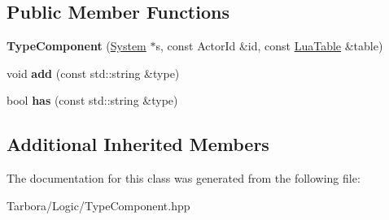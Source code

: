\subsection*{Public Member Functions}
\begin{DoxyCompactItemize}
\item 
\mbox{\label{classTarbora_1_1TypeComponent_ab59ac0e5fbeb699b383b3ce051663220}} 
{\bfseries Type\+Component} (\hyperlink{classTarbora_1_1System}{System} $\ast$s, const Actor\+Id \&id, const \hyperlink{classTarbora_1_1LuaTable}{Lua\+Table} \&table)
\item 
\mbox{\label{classTarbora_1_1TypeComponent_a55b1e9e293ec4658d34da96f44b56c20}} 
void {\bfseries add} (const std\+::string \&type)
\item 
\mbox{\label{classTarbora_1_1TypeComponent_aa26e79efb828e8a5300aeaf4555547e3}} 
bool {\bfseries has} (const std\+::string \&type)
\end{DoxyCompactItemize}
\subsection*{Additional Inherited Members}


The documentation for this class was generated from the following file\+:\begin{DoxyCompactItemize}
\item 
Tarbora/\+Logic/Type\+Component.\+hpp\end{DoxyCompactItemize}
